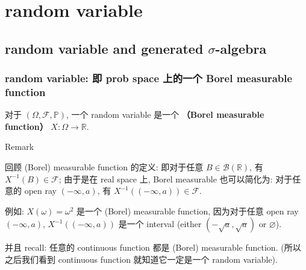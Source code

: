 \chapter{random variable}\label{random-variable}

\section{\texorpdfstring{random variable and generated \(\mathit{\sigma}\)-algebra}{random variable and generated \textbackslash mathit\{\textbackslash sigma\}-algebra}}\label{random-variable-and-generated-sigma-algebra}

\subsection{random variable: 即 prob space 上的一个 Borel measurable function}\label{random-variable-ux5373-prob-space-ux4e0aux7684ux4e00ux4e2a-borel-measurable-function}

\begin{definition}{}

对于  \((\Omega,\mathcal{F},\mathbb{P})\), 一个 random variable 是一个 \textbf{（Borel measurable function）} \(\mathit{X}:\Omega\rightarrow\mathbb{R}\).

\end{definition}

\begin{qlremark}{Remark}

回顾 (Borel) measurable function 的定义: 即对于任意 \(\mathit{B} \in \mathcal{B}(\mathbb{R})\), 有 \(\mathit{X}^{- 1}(\mathit{B}) \in \mathcal{F}\); 由于是在 real space 上, Borel measurable 也可以简化为: 对于任意的 open ray \(( - \infty,\mathit{a})\), 有 \(\mathit{X}^{- 1}(( - \infty,\mathit{a})) \in \mathcal{F}\).

例如: \(\mathit{X}(\mathit{\omega}) = \mathit{\omega}^{2}\) 是一个 (Borel) measurable function, 因为对于任意 open ray \(( - \infty,\mathit{a})\), \(\mathit{X}^{- 1}(( - \infty,\mathit{a}))\) 是一个 interval (either \(( - \sqrt{\mathit{a}},\sqrt{\mathit{a}})\) or \(\varnothing\)).

并且 recall: 任意的 continuous function 都是 (Borel) measurable function. (所以之后我们看到 continuous function 就知道它一定是一个 random variable).

\end{qlremark}

